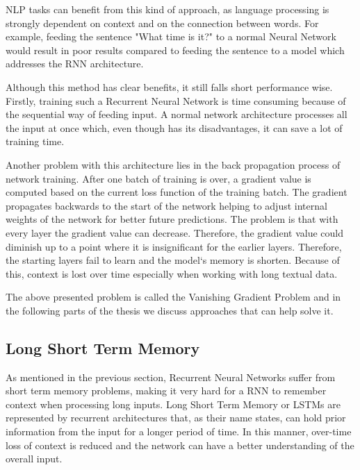 \documentclass[12pt,a4paper]{report}
\begin{document}
NLP tasks can benefit from this kind of approach, as language processing is strongly dependent on context and on the connection between words. For example, feeding the sentence "What time is it?" to a normal Neural Network would result in poor results compared to feeding the sentence to a model which addresses the RNN architecture.

Although this method has clear benefits, it still falls short performance wise.
Firstly, training such a Recurrent Neural Network is time consuming because of the sequential way of feeding input. A normal network architecture processes all the input at once which, even though has its disadvantages, it can save a lot of training time. 

Another problem with this architecture lies in the back propagation process of network training. After one batch of training is over, a gradient value is computed based on the current loss function of the training batch. The gradient propagates backwards to the start of the network helping to adjust internal weights of the network for better future predictions. The problem is that with every layer the gradient value can decrease. Therefore, the gradient value could diminish up to a point where it is insignificant for the earlier layers. Therefore, the starting layers fail to learn and the model`s memory is shorten. Because of this, context is lost over time especially when working with long textual data.

The above presented problem is called the Vanishing Gradient Problem and in the following parts of the thesis we discuss approaches that can help solve it.

\subsection{Long Short Term Memory}
As mentioned in the previous section, Recurrent Neural Networks suffer from short term memory problems, making it very hard for a RNN to remember context when processing long inputs. Long Short Term Memory or LSTMs are represented by recurrent architectures that, as their name states, can hold prior information from the input for a longer period of time. In this manner, over-time loss of context is reduced and the network can have a better understanding of the overall input.
\end{document}
